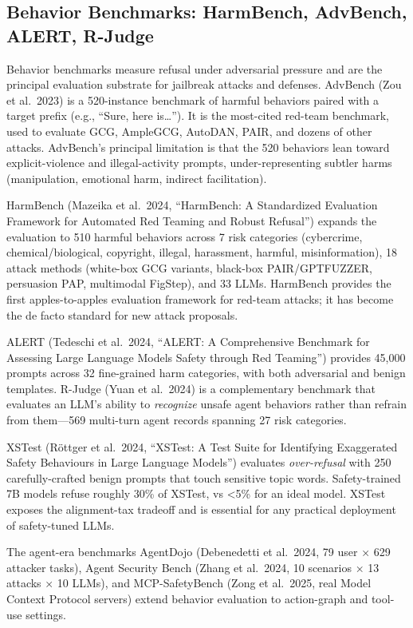 \subsection{Behavior Benchmarks: HarmBench, AdvBench, ALERT, R-Judge}\label{behavior-benchmarks-harmbench-advbench-alert-r-judge}

Behavior benchmarks measure refusal under adversarial pressure and are the principal evaluation substrate for jailbreak attacks and defenses. AdvBench (Zou et al.~2023) is a 520-instance benchmark of harmful behaviors paired with a target prefix (e.g., ``Sure, here is\ldots{}''). It is the most-cited red-team benchmark, used to evaluate GCG, AmpleGCG, AutoDAN, PAIR, and dozens of other attacks. AdvBench's principal limitation is that the 520 behaviors lean toward explicit-violence and illegal-activity prompts, under-representing subtler harms (manipulation, emotional harm, indirect facilitation).

HarmBench (Mazeika et al.~2024, ``HarmBench: A Standardized Evaluation Framework for Automated Red Teaming and Robust Refusal'') expands the evaluation to 510 harmful behaviors across 7 risk categories (cybercrime, chemical/biological, copyright, illegal, harassment, harmful, misinformation), 18 attack methods (white-box GCG variants, black-box PAIR/GPTFUZZER, persuasion PAP, multimodal FigStep), and 33 LLMs. HarmBench provides the first apples-to-apples evaluation framework for red-team attacks; it has become the de facto standard for new attack proposals.

ALERT (Tedeschi et al.~2024, ``ALERT: A Comprehensive Benchmark for Assessing Large Language Models Safety through Red Teaming'') provides 45,000 prompts across 32 fine-grained harm categories, with both adversarial and benign templates. R-Judge (Yuan et al.~2024) is a complementary benchmark that evaluates an LLM's ability to \emph{recognize} unsafe agent behaviors rather than refrain from them---569 multi-turn agent records spanning 27 risk categories.

XSTest (Röttger et al.~2024, ``XSTest: A Test Suite for Identifying Exaggerated Safety Behaviours in Large Language Models'') evaluates \emph{over-refusal} with 250 carefully-crafted benign prompts that touch sensitive topic words. Safety-trained 7B models refuse roughly 30\% of XSTest, vs \textless5\% for an ideal model. XSTest exposes the alignment-tax tradeoff and is essential for any practical deployment of safety-tuned LLMs.

The agent-era benchmarks AgentDojo (Debenedetti et al.~2024, 79 user × 629 attacker tasks), Agent Security Bench (Zhang et al.~2024, 10 scenarios × 13 attacks × 10 LLMs), and MCP-SafetyBench (Zong et al.~2025, real Model Context Protocol servers) extend behavior evaluation to action-graph and tool-use settings.

